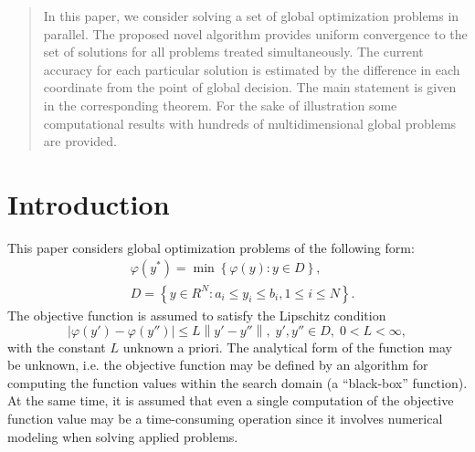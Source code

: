 \documentclass[smallcondensed]{svjour3}     %
\begin{document}
\begin{abstract}

In this paper, we consider solving a set of global optimization problems in parallel. The proposed novel algorithm provides uniform convergence to the set of solutions for all problems treated simultaneously. The current accuracy for each particular solution is estimated by the difference in each coordinate from the point of global decision. The main statement is given in the corresponding theorem. For the sake of illustration some computational results with hundreds of multidimensional global problems are provided. 



\end{abstract}

\section{Introduction} \label{intro}

This paper considers global optimization problems of the following form:
\begin{eqnarray}\label{main_problem}
& \varphi(y^\ast)=\min{\left\{\varphi(y):y\in D\right\}},\\
& D=\left\{y\in R^N: a_i\leq y_i \leq b_i, 1\leq i \leq N\right\}. \nonumber
\end{eqnarray}
The objective function is assumed to satisfy the Lipschitz condition 
\[
\left|\varphi(y')-\varphi(y'')\right|\leq L\left\|y'-y''\right\|,\; y',y'' \in D,\; 0<L<\infty,
\]
with the constant $L$ unknown a priori. The analytical form of the function may be unknown, i.e. the objective function may be defined by an algorithm for computing the function values within the search domain (a ``black-box'' function). At the same time, it is assumed that even a single computation of the objective function value may be a time-consuming operation since it involves numerical modeling when solving applied problems.
\end{document}

